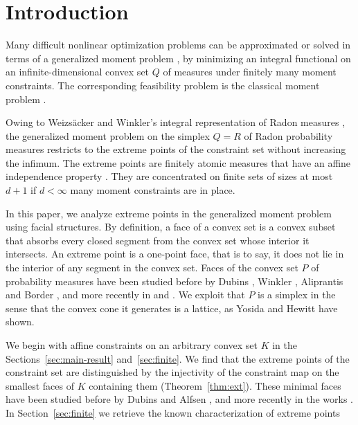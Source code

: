 \documentclass[a4paper,11pt,reqno]{amsart}
\numberwithin{equation}{section}
\theoremstyle{plain}
\theoremstyle{definition}
\begin{document}
\section{Introduction}
%
Many difficult nonlinear optimization problems can be approximated or solved 
in terms of a generalized moment problem 
\cite{henrion-etal20,klerk-laurent19,lasserre10,shapiro01}, by minimizing an 
integral functional on an infinite-dimensional convex set $Q$ of measures under 
finitely many moment constraints. The corresponding feasibility problem is the 
classical moment problem \cite{schmuedgen17}.
\par
%
Owing to Weizs\"acker and Winkler's integral representation of Radon measures 
\cite{weizsaecker-winkler79}, the generalized moment problem on the simplex $Q=R$ 
of Radon probability measures restricts to the extreme points of the constraint 
set without increasing the infimum. The extreme points are finitely atomic 
measures that have an affine independence property \cite{weizsaecker-winkler80,winkler88}. 
They are concentrated on finite sets of sizes at most $d+1$ if $d<\infty$ many 
moment constraints are in place. 
\par
%
In this paper, we analyze extreme points in the generalized moment problem using 
facial structures. By definition, a face of a convex set is a convex subset that 
absorbs every closed segment from the convex set whose interior it intersects. An 
extreme point is a one-point face, that is to say, it does not lie in the interior 
of any segment in the convex set. Faces of the convex set $P$ of probability
measures have been studied before by Dubins \cite{dubins62}, Winkler 
\cite{winkler88,winkler2000}, Aliprantis and Border \cite{aliprantis-border06},
and more recently in  \cite{weis25,weis-shirokov21} and \cite{dufour-prieto-rumeau25}.
We exploit that $P$ is a simplex in the sense that the convex cone it generates is 
a lattice, as Yosida and Hewitt \cite{yosida-hewitt52} have shown. 
\par
%
We begin with affine constraints on an arbitrary convex set $K$ in the 
Sections~\ref{sec:main-result} and~\ref{sec:finite}. We find that the extreme points 
of the constraint set are distinguished by the injectivity of the constraint map on 
the smallest faces of $K$ containing them (Theorem~\ref{thm:ext}). These minimal 
faces have been studied before by Dubins \cite{dubins62} and Alfsen \cite{alfsen71},  
and more recently in the works 
\cite{garcia-pacheco20,gorokhovik25,millan-roshchina23,weis25,weis-shirokov21}. 
In Section~\ref{sec:finite} we retrieve the known characterization of extreme points 
\end{document}
